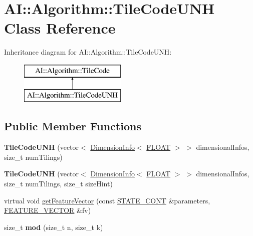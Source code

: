 \hypertarget{classAI_1_1Algorithm_1_1TileCodeUNH}{\section{A\-I\-:\-:Algorithm\-:\-:Tile\-Code\-U\-N\-H Class Reference}
\label{classAI_1_1Algorithm_1_1TileCodeUNH}
}
Inheritance diagram for A\-I\-:\-:Algorithm\-:\-:Tile\-Code\-U\-N\-H\-:\begin{figure}[H]
\begin{center}
\leavevmode
\includegraphics[height=2.000000cm]{classAI_1_1Algorithm_1_1TileCodeUNH}
\end{center}
\end{figure}
\subsection*{Public Member Functions}
\begin{DoxyCompactItemize}
\item 
\hypertarget{classAI_1_1Algorithm_1_1TileCodeUNH_abcbd8f8e4bcc48dda33a9e98a012fa5d}{{\bfseries Tile\-Code\-U\-N\-H} (vector$<$ \hyperlink{classAI_1_1Algorithm_1_1DimensionInfo}{Dimension\-Info}$<$ \hyperlink{namespaceAI_a41b74884a20833db653dded3918e05c3}{F\-L\-O\-A\-T} $>$ $>$ dimensional\-Infos, size\-\_\-t num\-Tilings)}\label{classAI_1_1Algorithm_1_1TileCodeUNH_abcbd8f8e4bcc48dda33a9e98a012fa5d}

\item 
\hypertarget{classAI_1_1Algorithm_1_1TileCodeUNH_ac6d35486b3f5e94a6a6d95dd4a5e1e14}{{\bfseries Tile\-Code\-U\-N\-H} (vector$<$ \hyperlink{classAI_1_1Algorithm_1_1DimensionInfo}{Dimension\-Info}$<$ \hyperlink{namespaceAI_a41b74884a20833db653dded3918e05c3}{F\-L\-O\-A\-T} $>$ $>$ dimensional\-Infos, size\-\_\-t num\-Tilings, size\-\_\-t size\-Hint)}\label{classAI_1_1Algorithm_1_1TileCodeUNH_ac6d35486b3f5e94a6a6d95dd4a5e1e14}

\item 
virtual void \hyperlink{classAI_1_1Algorithm_1_1TileCodeUNH_a7b13840ff09b20ff2ad06965f3f4800f}{get\-Feature\-Vector} (const \hyperlink{namespaceAI_aff63ec21d97dd5f086fddbc3103f5707}{S\-T\-A\-T\-E\-\_\-\-C\-O\-N\-T} \&parameters, \hyperlink{namespaceAI_a23a39e1b301a5c1345fa508796940631}{F\-E\-A\-T\-U\-R\-E\-\_\-\-V\-E\-C\-T\-O\-R} \&fv)
\item 
\hypertarget{classAI_1_1Algorithm_1_1TileCodeUNH_a02daa0818beff76016b3d000a2c86b68}{size\-\_\-t {\bfseries mod} (size\-\_\-t n, size\-\_\-t k)}\label{classAI_1_1Algorithm_1_1TileCodeUNH_a02daa0818beff76016b3d000a2c86b68}

\end{DoxyCompactItemize}
